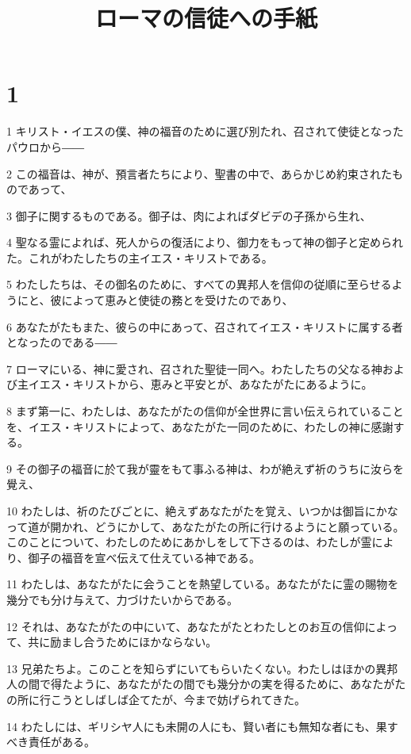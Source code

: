 

\title{ローマの信徒への手紙}


\chapter{1}

\par 1 キリスト・イエスの僕、神の福音のために選び別たれ、召されて使徒となったパウロから――
\par 2 この福音は、神が、預言者たちにより、聖書の中で、あらかじめ約束されたものであって、
\par 3 御子に関するものである。御子は、肉によればダビデの子孫から生れ、
\par 4 聖なる霊によれば、死人からの復活により、御力をもって神の御子と定められた。これがわたしたちの主イエス・キリストである。
\par 5 わたしたちは、その御名のために、すべての異邦人を信仰の従順に至らせるようにと、彼によって恵みと使徒の務とを受けたのであり、
\par 6 あなたがたもまた、彼らの中にあって、召されてイエス・キリストに属する者となったのである――
\par 7 ローマにいる、神に愛され、召された聖徒一同へ。わたしたちの父なる神および主イエス・キリストから、恵みと平安とが、あなたがたにあるように。
\par 8 まず第一に、わたしは、あなたがたの信仰が全世界に言い伝えられていることを、イエス・キリストによって、あなたがた一同のために、わたしの神に感謝する。
\par 9 その御子の福音に於て我が靈をもて事ふる神は、わが絶えず祈のうちに汝らを覺え、
\par 10 わたしは、祈のたびごとに、絶えずあなたがたを覚え、いつかは御旨にかなって道が開かれ、どうにかして、あなたがたの所に行けるようにと願っている。このことについて、わたしのためにあかしをして下さるのは、わたしが霊により、御子の福音を宣べ伝えて仕えている神である。
\par 11 わたしは、あなたがたに会うことを熱望している。あなたがたに霊の賜物を幾分でも分け与えて、力づけたいからである。
\par 12 それは、あなたがたの中にいて、あなたがたとわたしとのお互の信仰によって、共に励まし合うためにほかならない。
\par 13 兄弟たちよ。このことを知らずにいてもらいたくない。わたしはほかの異邦人の間で得たように、あなたがたの間でも幾分かの実を得るために、あなたがたの所に行こうとしばしば企てたが、今まで妨げられてきた。
\par 14 わたしには、ギリシヤ人にも未開の人にも、賢い者にも無知な者にも、果すべき責任がある。
